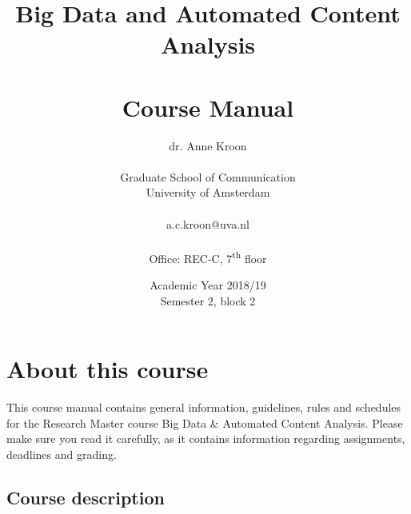 \documentclass[a4paper,10pt]{report}
\title{Big Data and Automated Content Analysis\\~\\Course Manual}
\author{dr. Anne Kroon\\~\\Graduate School of Communication\\University of Amsterdam\\~\\a.c.kroon@uva.nl\\~\\Office: REC-C, 7\textsuperscript{th} floor}
\date{Academic Year 2018/19\\Semester 2, block 2}
\begin{document}
\maketitle



\chapter{About this course}

This course manual contains general information, guidelines, rules and schedules for the Research Master course Big Data \& Automated Content Analysis. Please make sure you read it carefully, as it  contains information regarding assignments, deadlines and grading.

\section{Course description}
 
 
 
\end{document}
